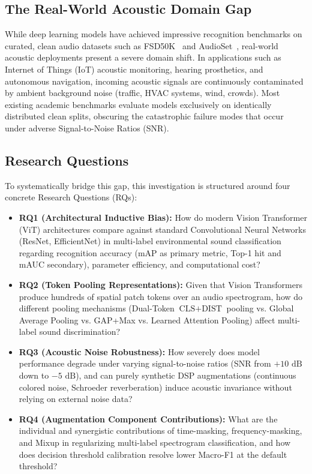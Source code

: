 \documentclass[11pt,a4paper]{article}
\begin{document}
\subsection{The Real-World Acoustic Domain Gap}
While deep learning models have achieved impressive recognition benchmarks on curated, clean audio datasets such as FSD50K~\cite{fonseca2021fsd50k} and AudioSet~\cite{gemmeke2017audioset}, real-world acoustic deployments present a severe domain shift. In applications such as Internet of Things (IoT) acoustic monitoring, hearing prosthetics, and autonomous navigation, incoming acoustic signals are continuously contaminated by ambient background noise (traffic, HVAC systems, wind, crowds). Most existing academic benchmarks evaluate models exclusively on identically distributed clean splits, obscuring the catastrophic failure modes that occur under adverse Signal-to-Noise Ratios (SNR).

\subsection{Research Questions}
To systematically bridge this gap, this investigation is structured around four concrete Research Questions (RQs):
\begin{itemize}
    \item \textbf{RQ1 (Architectural Inductive Bias):} How do modern Vision Transformer (ViT) architectures compare against standard Convolutional Neural Networks (ResNet, EfficientNet) in multi-label environmental sound classification regarding recognition accuracy (mAP as primary metric, Top-1 hit and mAUC secondary), parameter efficiency, and computational cost?
    \item \textbf{RQ2 (Token Pooling Representations):} Given that Vision Transformers produce hundreds of spatial patch tokens over an audio spectrogram, how do different pooling mechanisms (Dual-Token $\text{CLS}+\text{DIST}$ pooling vs. Global Average Pooling vs. GAP+Max vs. Learned Attention Pooling) affect multi-label sound discrimination?
    \item \textbf{RQ3 (Acoustic Noise Robustness):} How severely does model performance degrade under varying signal-to-noise ratios (SNR from $+10\text{ dB}$ down to $-5\text{ dB}$), and can purely synthetic DSP augmentations (continuous colored noise, Schroeder reverberation) induce acoustic invariance without relying on external noise data?
    \item \textbf{RQ4 (Augmentation Component Contributions):} What are the individual and synergistic contributions of time-masking, frequency-masking, and Mixup in regularizing multi-label spectrogram classification, and how does decision threshold calibration resolve lower Macro-F1 at the default threshold?
\end{itemize}
\end{document}
